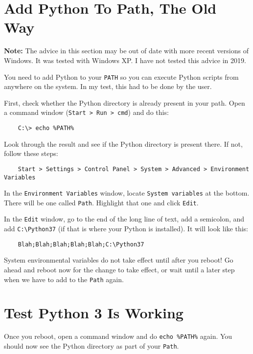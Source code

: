 \section{Add Python To Path, The Old Way}

\textbf{Note:} The advice in this section may be out of date with more
recent versions of Windows. It was tested with Windows XP. I have not tested this advice in 2019.

You need to add Python to your \texttt{PATH} so you can execute Python scripts
from anywhere on the system. In my test, this had to be done by the user.

First, check whether the Python directory is already present in your
path. Open a command window (\texttt{Start > Run > cmd}) and do this:

\begin{verbatim}
    C:\> echo %PATH%
\end{verbatim}

Look through the result and see if the Python directory is present
there. If not, follow these steps:

\begin{verbatim}
    Start > Settings > Control Panel > System > Advanced > Environment Variables
\end{verbatim}

In the \texttt{Environment Variables} window, locate \texttt{System variables} at the
bottom. There will be one called \texttt{Path}. Highlight that one and
click \texttt{Edit}.

In the \texttt{Edit} window, go to the end of the long line of text, add a
semicolon, and add \texttt{C:\textbackslash{}Python37} (if that is where your Python is
installed). It will look like this:

\begin{verbatim}
    Blah;Blah;Blah;Blah;Blah;C:\Python37
\end{verbatim}

System environmental variables do not take effect until after you
reboot! Go ahead and reboot now for the change to take effect, or
wait until a later step when we have to add to the \texttt{Path} again.

\section{Test Python 3 Is Working}

Once you reboot, open a command window and do \texttt{echo \%PATH\%} again.
You should now see the Python directory as part of your \texttt{Path}.


